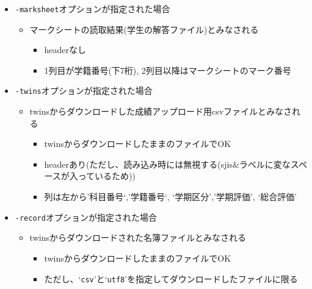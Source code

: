 \begin{itemize}
\item \texttt{-marksheet}オプションが指定された場合

\begin{itemize}
\item マークシートの読取結果(学生の解答ファイル)とみなされる

\begin{itemize}
\item headerなし

\item 1列目が学籍番号(下7桁), 2列目以降はマークシートのマーク番号

\end{itemize}

\end{itemize}

\item \texttt{-twins}オプションが指定された場合

\begin{itemize}
\item twinsからダウンロードした成績アップロード用csvファイルとみなされる

\begin{itemize}
\item twinsからダウンロードしたままのファイルでOK

\item headerあり(ただし、読み込み時には無視する(sjis\&ラベルに変なスペースが入っているため))

\item 列は左から'科目番号`,'学籍番号`, `学期区分','学期評価', `総合評価'

\end{itemize}

\end{itemize}

\item \texttt{-record}オプションが指定された場合

\begin{itemize}
\item twinsからダウンロードされた名簿ファイルとみなされる

\begin{itemize}
\item twinsからダウンロードしたままのファイルでOK

\item ただし、`\texttt{csv}'と`\texttt{utf8}'を指定してダウンロードしたファイルに限る


\end{itemize}
\end{itemize}
\end{itemize}
